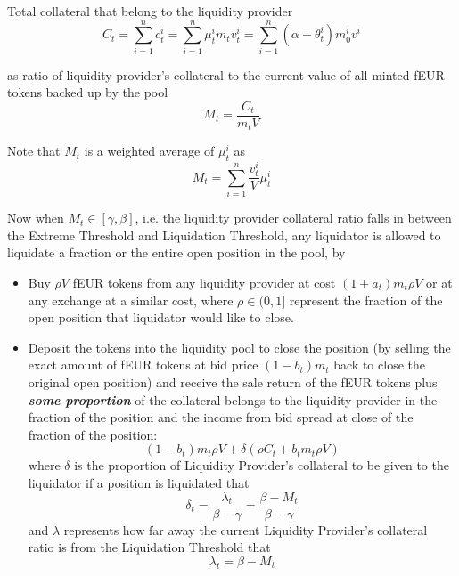 \documentclass{article}
\begin{document}
Total collateral that belong to the liquidity provider
$$C_t=\sum_{i=1}^n c_t^i = \sum_{i=1}^n \mu_t^i m_t v_t^i= \sum_{i=1}^n (\alpha - \theta_t^i)m_0^i v^i$$

as ratio of liquidity provider's collateral to the current value of all minted fEUR tokens backed up by the pool
$$ M_t=\frac{C_t}{m_t V}$$

Note that $M_t$ is a weighted average of $\mu_t^i$ as 
$$ M_t=\sum_{i=1}^n  \frac{v_t^i}{V} \mu_t^i$$

Now when $M_t \in [\gamma,\beta]$, i.e. the liquidity provider collateral ratio falls in between the Extreme Threshold and Liquidation Threshold, any liquidator is allowed to liquidate a fraction or the entire open position in the pool, by

\begin{itemize}

    \item Buy $\rho V$ fEUR tokens from any liquidity provider at cost $(1+a_t)m_t \rho V$ or at any exchange at a similar cost, where $\rho \in (0,1]$ represent the fraction of the open position that liquidator would like to close. 
    
    \item Deposit the tokens into the liquidity pool to close the position (by selling the exact amount of fEUR tokens at bid price $(1-b_t)m_t$ back to close the original open position) and receive the sale return of the fEUR tokens plus \textbf{\textit{some proportion}} of the collateral belongs to the liquidity provider in the fraction of the position and the income from bid spread at close of the fraction of the position:
    $$(1-b_t)m_t \rho V + \delta(\rho C_t + b_t m_t \rho V)$$
    where $\delta$ is the proportion of Liquidity Provider's collateral to be given to the liquidator if a position is liquidated that $$ \delta_t=\frac{\lambda_t}{\beta-\gamma}=\frac{\beta-M_t}{\beta-\gamma}$$
    and $\lambda$ represents how far away the current Liquidity Provider's collateral ratio is from the Liquidation Threshold that $$\lambda_t=\beta-M_t$$
    
    \begin{center}
\end{center}
\end{itemize}
\end{document}
